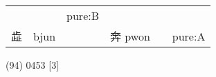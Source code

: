 \documentclass[14pt,a4paper]{scrartcl}
\begin{document}
\begin{longtable}[c]{@{}llllll@{}}
\begin{minipage}[t]{0.14\columnwidth}
\strut\end{minipage} &
\begin{minipage}[t]{0.14\columnwidth}\raggedright\strut
\strut\end{minipage} &
\begin{minipage}[t]{0.14\columnwidth}\raggedright\strut
pure:B
\strut\end{minipage}\tabularnewline
\begin{minipage}[t]{0.14\columnwidth}\raggedright\strut
歮
\strut\end{minipage} &
\begin{minipage}[t]{0.14\columnwidth}\raggedright\strut
bjun
\strut\end{minipage} &
\begin{minipage}[t]{0.14\columnwidth}\raggedright\strut
\strut\end{minipage} &
\begin{minipage}[t]{0.14\columnwidth}\raggedright\strut
奔 pwon
\strut\end{minipage} &
\begin{minipage}[t]{0.14\columnwidth}\raggedright\strut
\strut\end{minipage} &
\begin{minipage}[t]{0.14\columnwidth}\raggedright\strut
pure:A
\strut\end{minipage}\tabularnewline
\bottomrule
\end{longtable}

(94) 0453 {[}3{]}
\end{document}
